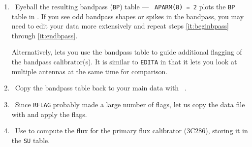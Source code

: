 \begin{enumerate}
\item\ Eyeball the resulting bandpass ({\tt BP}) table --- {\tt
    APARM(8) = 2} plots the {\tt BP} table in {\tt {}}\@.
    If you see odd bandpass shapes or spikes in the bandpass, you may
    need to edit your data more extensively and repeat steps
    \ref{it:beginbpass} through \ref{it:endbpass}.

Alternatively, {\tt {}} lets you use the bandpass table to
guide additional flagging of the bandpass calibrator(s).  It is
similar to {\tt EDITA} in that it lets you look at multiple antennas
at the same time for comparison.

\item\ Copy the bandpass table back to your main data with {\tt
    }\@.

\item\ Since {\tt RFLAG} probably made a large number of flags, let us
  copy the data file with {\tt {}} and apply the
  flags.

\item\ Use {\tt {}} to compute the flux for the primary flux
calibrator (3C286), storing it in the {\tt SU} table.


\end{enumerate}
